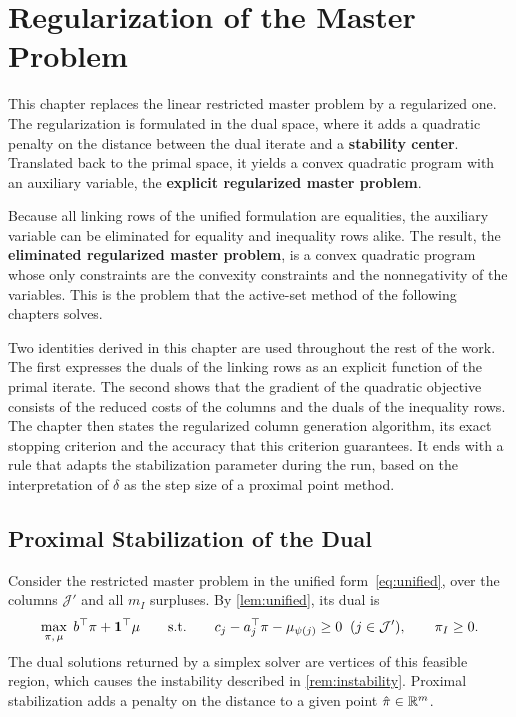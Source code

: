 \chapter{Regularization of the Master Problem}
\label{chap:regularization}

\vspace*{\fill}

This chapter replaces the linear restricted master problem by a regularized one. The
regularization is formulated in the dual space, where it adds a quadratic penalty on the
distance between the dual iterate and a \textbf{stability center}. Translated back to the
primal space, it yields a convex quadratic program with an auxiliary variable, the
\textbf{explicit regularized master problem}.

\medskip

Because all linking rows of the unified formulation are equalities, the auxiliary variable
can be eliminated for equality and inequality rows alike. The result, the
\textbf{eliminated regularized master problem}, is a convex quadratic program whose only
constraints are the convexity constraints and the nonnegativity of the variables. This is the
problem that the active-set method of the following chapters solves.

\medskip

Two identities derived in this chapter are used throughout the rest of the work. The first
expresses the duals of the linking rows as an explicit function of the primal iterate. The
second shows that the gradient of the quadratic objective consists of the reduced costs of
the columns and the duals of the inequality rows. The chapter then states the regularized
column generation algorithm, its exact stopping criterion and the accuracy that this
criterion guarantees. It ends with a rule that adapts the stabilization parameter during the
run, based on the interpretation of $\delta$ as the step size of a proximal point method.

\vspace*{\fill}

\newpage


\section{Proximal Stabilization of the Dual}
\label{sec:proximal}

Consider the restricted master problem in the unified form~\eqref{eq:unified}, over the
columns $\mathcal{J}'$ and all $m_I$ surpluses. By \cref{lem:unified}, its dual is
\begin{equation} \label{eq:restricted-dual}
\max_{\pi,\,\mu}\; b^\top\pi + \mathbf{1}^\top\mu
\qquad\text{s.t.}\qquad
c_j - a_j^\top\pi - \mu_{\psi(j)}\ge0 \;\;(j\in\mathcal{J}'),\qquad \pi_I\ge0 .
\end{equation}
The dual solutions returned by a simplex solver are vertices of this feasible region, which
causes the instability described in \cref{rem:instability}. Proximal stabilization adds a penalty on the
distance to a given point $\hat{\pi}\in\mathbb{R}^m$.

